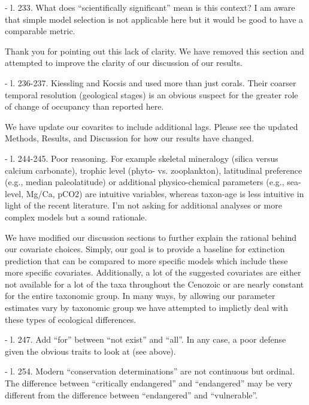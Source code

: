 \documentclass[12pt,letterpaper]{article}
\begin{document}
\begin{refsection}
\begin{bfseries}
  - l. 233. What does “scientifically significant” mean is this context? I am aware that simple model selection is not applicable here but it would be good to have a comparable metric.
\end{bfseries}

Thank you for pointing out this lack of clarity. We have removed this section and attempted to improve the clarity of our discussion of our results.

\begin{bfseries}
  - l. 236-237. Kiessling and Kocsis and used more than just corals. Their coarser temporal resolution (geological stages) is an obvious suspect for the greater role of change of occupancy than reported here. 
\end{bfseries}

We have update our covarites to include additional lags. Please see the updated Methods, Results, and Discussion for how our results have changed.

\begin{bfseries}
  - l. 244-245. Poor reasoning. For example skeletal mineralogy (silica versus calcium carbonate), trophic level (phyto- vs. zooplankton), latitudinal preference (e.g., median paleolatitude) or additional physico-chemical parameters (e.g., sea-level, Mg/Ca, pCO2) are intuitive variables, whereas taxon-age is less intuitive in light of the recent literature. I’m not asking for additional analyses or more complex models but a sound rationale.
\end{bfseries}

We have modified our discussion sections to further explain the rational behind our covariate choices. Simply, our goal is to provide a baseline for extinction prediction that can be compared to more specific models which include these more specific covariates. Additionally, a lot of the suggested covariates are either not available for a lot of the taxa throughout the Cenozoic or are nearly constant for the entire taxonomic group. In many ways, by allowing our parameter estimates vary by taxonomic group we have attempted to implictly deal with these types of ecological differences.


\begin{bfseries}
  - l. 247. Add “for” between “not exist” and “all”. In any case, a poor defense given the obvious traits to look at (see above).

  - l. 254. Modern “conservation determinations” are not continuous but ordinal. The difference between “critically endangered” and “endangered” may be very different from the difference between “endangered” and “vulnerable”. 


\end{bfseries}
\end{refsection}
\end{document}
